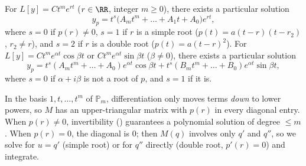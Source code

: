 \documentclass[10pt]{scrartcl}
\begin{document}
\begin{theorem*}
  \begin{enumerate}
    \ii[(a)] For $L[y]=Ct^m e^{rt}$ ($r\in\RR$, integer $m\ge 0$), there exists a particular solution
    \[
      y_p = t^s\bigl(A_m t^m + \dots + A_1 t + A_0\bigr)e^{rt},
    \]
    where $s=0$ if $p(r)\neq 0$, $s=1$ if $r$ is a simple root ($p(t)=a(t-r)(t-r_2)$, $r_2\neq r$), and $s=2$ if $r$ is a double root ($p(t)=a(t-r)^2$).
    \ii[(b)] For $L[y]=Ct^m e^{\alpha t}\cos\beta t$ or $Ct^m e^{\alpha t}\sin\beta t$ ($\beta\neq 0$), there exists a particular solution
    \[
      y_p = t^s(A_m t^m+\dots+A_0)e^{\alpha t}\cos\beta t + t^s(B_m t^m+\dots+B_0)e^{\alpha t}\sin\beta t,
    \]
    where $s=0$ if $\alpha+i\beta$ is not a root of $p$, and $s=1$ if it is.
  \end{enumerate}
\end{theorem*}
\begin{ideabox}
  In the basis $1,t,\dots,t^m$ of $\mathbb P_m$, differentiation only moves terms \emph{down} to lower powers, so $M$ has an upper-triangular matrix with $p(r)$ in every diagonal entry. When $p(r)\neq 0$, invertibility () guarantees a polynomial solution of degree $\le m$. When $p(r)=0$, the diagonal is $0$; then $M(q)$ involves only $q'$ and $q''$, so we solve for $u=q'$ (simple root) or for $q''$ directly (double root, $p'(r)=0$) and integrate.
\end{ideabox}
\end{document}
